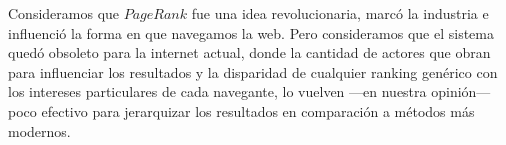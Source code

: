 \vspace{1em}
Consideramos que $PageRank$ fue una idea revolucionaria, marcó la industria e influenció la forma en que navegamos la web. Pero consideramos que el sistema quedó obsoleto para la internet actual, donde la cantidad de actores que obran para influenciar los resultados y la disparidad de cualquier ranking genérico con los intereses particulares de cada navegante, lo vuelven ---en nuestra opinión--- poco efectivo para jerarquizar los resultados en comparación a métodos más modernos. 